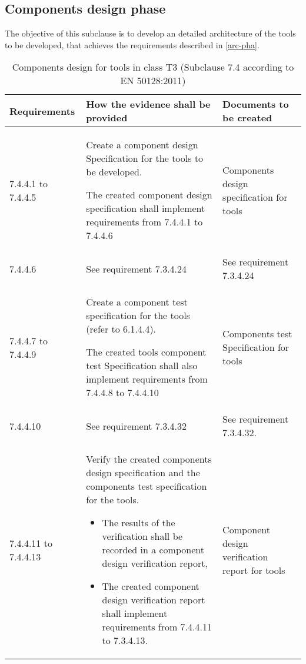 \documentclass{template/openetcs_report}
\begin{document}
\subsection{Components design phase}
\begin{flushleft}
The objective of this subclause is to develop an detailed architecture of the tools to be developed, that achieves the requirements described in \ref{arc-pha}.
\end{flushleft}
{\footnotesize\sffamily\centering
\begin{longtable}{|p{2cm}|p{9cm}|p{3cm}|}
\caption{Components design for tools in class T3 (Subclause 7.4 according to EN 50128:2011)}\\
\hline
\bfseries Requirements & \bfseries How the evidence shall be provided & \bfseries Documents to be created\\
\hline
\hline
\endhead
\hline
\endfoot

7.4.4.1 to 7.4.4.5 & Create a component design Specification for the tools to be developed. 

The created component design specification shall implement requirements from 7.4.4.1 to 7.4.4.6
& Components design specification for tools\\ 
\hline
7.4.4.6 & See requirement 7.3.4.24 & See requirement 7.3.4.24\\ 
\hline
7.4.4.7 to 7.4.4.9 & Create a component test specification for the tools (refer to 6.1.4.4).

The created tools component test Specification shall also implement requirements from 7.4.4.8 to 7.4.4.10
& Components test Specification for tools\\ 
\hline
7.4.4.10 & See requirement 7.3.4.32 & See requirement 7.3.4.32.\\ 
\hline
7.4.4.11 to 7.4.4.13 & Verify the created components design specification and the components test specification for the tools.
\begin{itemize}\itemsep=0pt
  \item The results of the verification shall be recorded in a component design verification report,
  \item The created component design verification report shall implement requirements from 7.4.4.11 to 7.3.4.13. 
\end{itemize}
& Component design verification report for tools\\ 
\hline
\end{longtable}}
\end{document}
